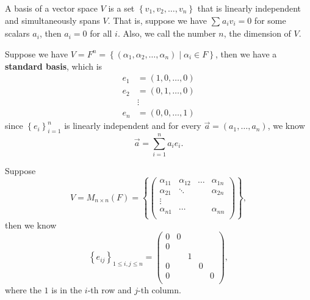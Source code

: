 \begin{prev}
    A basis of a vector space \(V\)  is a set \(\left\{ v_1, v_2, \dots , v_n \right\} \) that is linearly independent and simultaneously spans \(V\). That is, suppose we have \(\sum_{} a_i v_i = 0\) for some scalars \(a_i\), then \(a_i = 0\) for all \(i\). Also, we call the number \(n\), the dimension of \(V\).  
\end{prev}

\begin{eg}
    Suppose we have \(V=F^n= \left\{ (\alpha _1, \alpha _2, \dots , \alpha _n) \mid \alpha _i \in F\right\} \), then we have a \textbf{standard basis}, which is 
    \begin{align*}
        e_1 &= (1, 0, \dots , 0) \\
        e_2 &= (0, 1, \dots , 0) \\
        &\vdots \\
        e_n &= (0, 0, \dots , 1)
    \end{align*}  
    since \(\left\{ e_i \right\}_{i=1}^n \) is linearly independent and for every \(\vec{a} = (a_1, \dots , a_n)\), we know 
    \[
        \vec{a} = \sum_{i=1}^n a_i e_i. 
    \] 
\end{eg}

\begin{eg}
    Suppose 
    \[
        V = M_{n \times n}(F) = \left\{ \begin{pmatrix}
            \alpha _{11} & \alpha _{12} & \dots  & \alpha _{1n}  \\
            \alpha _{21} & \ddots &  & \alpha _{2n}  \\
            \vdots &  &  &   \\
            \alpha _{n1} & \cdots  &  & \alpha _{nn}  \\
        \end{pmatrix} \right\},
    \] then we know 
    \[
        \left\{ e_{ij} \right\}_{1 \le i ,j \le n} = \begin{pmatrix}
            0 & 0 &  &  &   \\
            0 &  &  &  &   \\
             &  & 1 &  &   \\
            0 &  &  & 0 &   \\
            0 &  &  &  & 0  \\
        \end{pmatrix} ,
    \] where the \(1\) is in the \(i\)-th row and \(j\)-th column.   
\end{eg}

